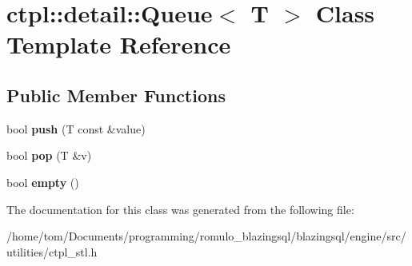 \hypertarget{classctpl_1_1detail_1_1Queue}{}\section{ctpl\+:\+:detail\+:\+:Queue$<$ T $>$ Class Template Reference}
\label{classctpl_1_1detail_1_1Queue}
\subsection*{Public Member Functions}
\begin{DoxyCompactItemize}
\item 
\mbox{\label{classctpl_1_1detail_1_1Queue_ae153feef41c16226806a5f9becbf5c2b}} 
bool {\bfseries push} (T const \&value)
\item 
\mbox{\label{classctpl_1_1detail_1_1Queue_a668d8928acc249659f50f3149e7e725f}} 
bool {\bfseries pop} (T \&v)
\item 
\mbox{\label{classctpl_1_1detail_1_1Queue_ae884fc85f8b25aef5938742f0271b2fc}} 
bool {\bfseries empty} ()
\end{DoxyCompactItemize}


The documentation for this class was generated from the following file\+:\begin{DoxyCompactItemize}
\item 
/home/tom/\+Documents/programming/romulo\+\_\+blazingsql/blazingsql/engine/src/utilities/ctpl\+\_\+stl.\+h\end{DoxyCompactItemize}
